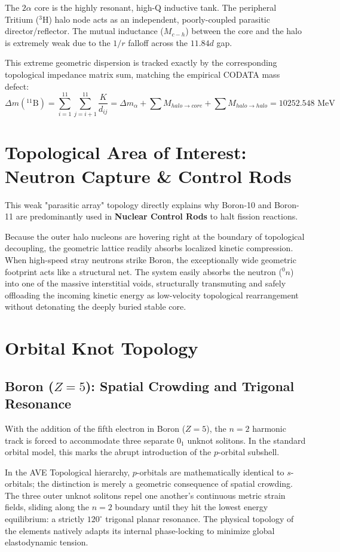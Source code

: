 The $2\alpha$ core is the highly resonant, high-Q inductive tank. The peripheral Tritium ($^3$H) halo node acts as an independent, poorly-coupled parasitic director/reflector. The mutual inductance ($M_{c-h}$) between the core and the halo is extremely weak due to the $1/r$ falloff across the $11.84d$ gap.

This extreme geometric dispersion is tracked exactly by the corresponding topological impedance matrix sum, matching the empirical CODATA mass defect:
\begin{equation}
    \Delta m(^{11}\text{B}) = \sum_{i=1}^{11} \sum_{j=i+1}^{11} \frac{K}{d_{ij}} = \Delta m_{\alpha} + \sum M_{halo\rightarrow core} + \sum M_{halo\rightarrow halo} = 10252.548 \text{ MeV}
\end{equation}

\section{Topological Area of Interest: Neutron Capture \& Control Rods}
This weak "parasitic array" topology directly explains why Boron-10 and Boron-11 are predominantly used in \textbf{Nuclear Control Rods} to halt fission reactions. 

Because the outer halo nucleons are hovering right at the boundary of topological decoupling, the geometric lattice readily absorbs localized kinetic compression. When high-speed stray neutrons strike Boron, the exceptionally wide geometric footprint acts like a structural net. The system easily absorbs the neutron ($^0n$) into one of the massive interstitial voids, structurally transmuting and safely offloading the incoming kinetic energy as low-velocity topological rearrangement without detonating the deeply buried stable core. 


\section{Orbital Knot Topology}
\subsection{Boron ($Z=5$): Spatial Crowding and Trigonal Resonance}
With the addition of the fifth electron in Boron ($Z=5$), the $n=2$ harmonic track is forced to accommodate three separate $0_1$ unknot solitons. In the standard orbital model, this marks the abrupt introduction of the $p$-orbital subshell.

In the AVE Topological hierarchy, $p$-orbitals are mathematically identical to $s$-orbitals; the distinction is merely a geometric consequence of spatial crowding. The three outer unknot solitons repel one another's continuous metric strain fields, sliding along the $n=2$ boundary until they hit the lowest energy equilibrium: a strictly $120^\circ$ trigonal planar resonance. The physical topology of the elements natively adapts its internal phase-locking to minimize global elastodynamic tension.



